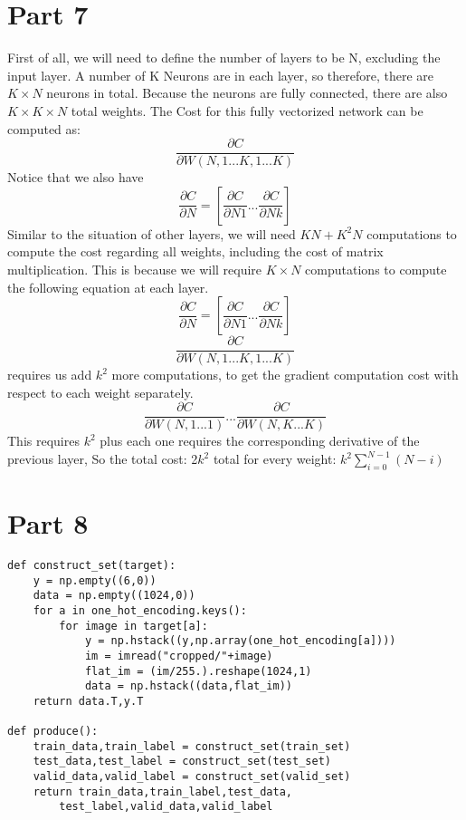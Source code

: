 \documentclass{article}
\begin{document}
\section*{Part 7}
First of all, we will need to define the number of layers to be N, excluding the input layer. A number of K Neurons are in each layer, so therefore, there are $K \times N$ neurons in total. Because the neurons are fully connected, there are also $K\times K \times N$ total weights. The Cost for this fully vectorized network can be computed as:
\begin{equation*}
    \frac {\partial C} {\partial W(N,1...K,1...K)}
\end{equation*}
Notice that we also have
\begin{equation*}
    \frac {\partial C} {\partial N} = [\frac {\partial C} {\partial N1}... \frac {\partial C} {\partial Nk}]
\end{equation*}
Similar to the situation of other layers, we will need $KN + K^2N$ computations to compute the cost regarding all weights, including the cost of matrix multiplication. This is because we will require $K \times N$ computations to compute the following equation at each layer.
\begin{equation*}
\frac {\partial C} {\partial N} = [\frac {\partial C} {\partial N1}... \frac {\partial C} {\partial Nk}]
\end{equation*}
\begin{equation*}
\frac {\partial C} {\partial W(N,1...K,1...K)}
\end{equation*}requires us add $k^2$ more computations, to get the gradient computation cost with respect to each weight separately.
\begin{equation*}
    \frac {\partial C} {\partial W(N,1...1)}...\frac {\partial C} {\partial W(N,K...K)}
\end{equation*}
This requires $k^2$ plus each one requires the corresponding derivative of the previous layer,
So the total cost: 2$k^2$
total for every weight: $k^2\sum_{i=0}^{N-1} (N - i)$

\section*{Part 8}

\Large\begin{lstlisting}[basicstyle=\large\ttfamily]
def construct_set(target):
    y = np.empty((6,0))
    data = np.empty((1024,0))
    for a in one_hot_encoding.keys():
        for image in target[a]:
            y = np.hstack((y,np.array(one_hot_encoding[a])))
            im = imread("cropped/"+image)
            flat_im = (im/255.).reshape(1024,1)
            data = np.hstack((data,flat_im))
    return data.T,y.T

def produce():
    train_data,train_label = construct_set(train_set)
    test_data,test_label = construct_set(test_set)
    valid_data,valid_label = construct_set(valid_set)
    return train_data,train_label,test_data,
        test_label,valid_data,valid_label 
\end{lstlisting}
\end{document}

